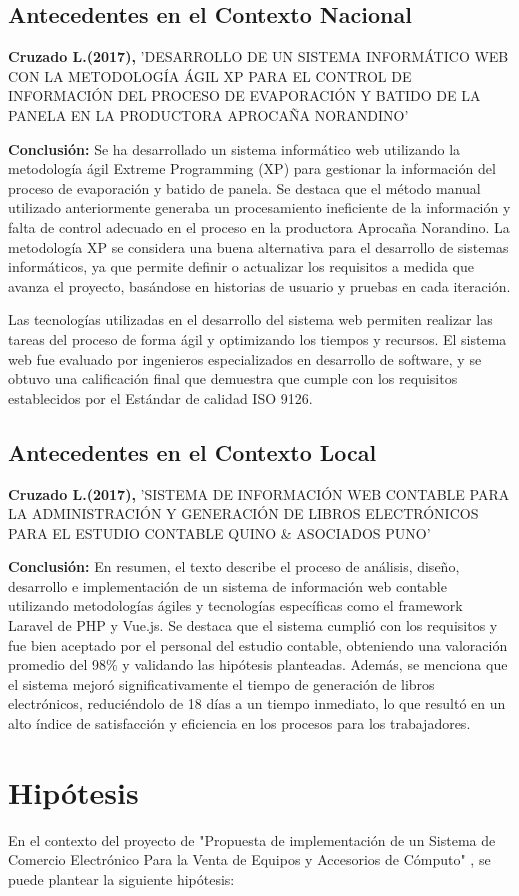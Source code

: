 \documentclass[12pt,a4paper]{article}
\newcommand{\espacio}{\par\vspace{3mm}}
\newcommand{\newsection}[1]{\section{\hspace{6mm} #1}}%
\newcommand{\newsubsection}[1]{\subsection{\hspace{5mm} #1}}
\newcommand{\titulo}{"Propuesta de implementación de un Sistema de Comercio Electrónico Para la Venta de Equipos y Accesorios de Cómputo" }
\begin{document}
\newsubsection{Antecedentes en el Contexto Nacional}
\textbf{Cruzado L.(2017),}
'DESARROLLO DE UN SISTEMA INFORMÁTICO WEB CON LA METODOLOGÍA ÁGIL XP PARA EL CONTROL DE INFORMACIÓN DEL PROCESO DE EVAPORACIÓN Y BATIDO DE LA PANELA EN LA PRODUCTORA APROCAÑA NORANDINO' 
\espacio
\textbf{Conclusión: } 
Se ha desarrollado un sistema informático web utilizando la metodología ágil Extreme Programming (XP) para gestionar la información del proceso de evaporación y batido de panela. Se destaca que el método manual utilizado anteriormente generaba un procesamiento ineficiente de la información y falta de control adecuado en el proceso en la productora Aprocaña Norandino.
La metodología XP se considera una buena alternativa para el desarrollo de sistemas informáticos, ya que permite definir o actualizar los requisitos a medida que avanza el proyecto, basándose en historias de usuario y pruebas en cada iteración.
\espacio
Las tecnologías utilizadas en el desarrollo del sistema web permiten realizar las tareas del proceso de forma ágil y optimizando los tiempos y recursos.
El sistema web fue evaluado por ingenieros especializados en desarrollo de software, y se obtuvo una calificación final que demuestra que cumple con los requisitos establecidos por el Estándar de calidad ISO 9126.
\cite{nacional}

\newsubsection{Antecedentes en el Contexto Local}
\textbf{Cruzado L.(2017),}
'SISTEMA DE INFORMACIÓN WEB CONTABLE PARA LA ADMINISTRACIÓN Y GENERACIÓN DE LIBROS ELECTRÓNICOS PARA EL ESTUDIO CONTABLE QUINO \& ASOCIADOS PUNO'
\espacio
\textbf{Conclusión: } 
En resumen, el texto describe el proceso de análisis, diseño, desarrollo e implementación de un sistema de información web contable utilizando metodologías ágiles y tecnologías específicas como el framework Laravel de PHP y Vue.js. Se destaca que el sistema cumplió con los requisitos y fue bien aceptado por el personal del estudio contable, obteniendo una valoración promedio del 98\% 
y validando las hipótesis planteadas. Además, se menciona que el sistema mejoró significativamente el tiempo de generación de libros electrónicos, reduciéndolo de 18 días a un tiempo inmediato, lo que resultó en un alto índice de satisfacción y eficiencia en los procesos 
para los trabajadores.
\cite{local}


\newpage
\newsection{Hipótesis }

En el contexto del proyecto de \titulo , se puede plantear la siguiente hipótesis:
\espacio
\end{document}

